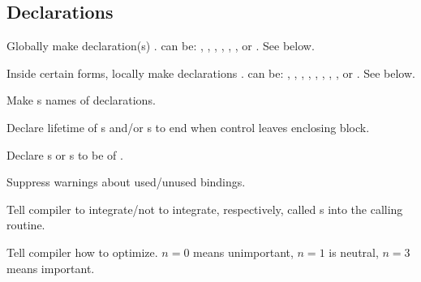 \subsection{Declarations}
\begin{LIST}{1cm}

  {
    Globally make declaration(s) .  can be:
    ,
    ,
    ,
    ,
    ,
    , or
    .
    See below.
  }

  {
    Inside certain forms, locally make declarations
    .  can be:
    ,
    ,
    ,
    ,
    ,
    ,
    ,
    , or
    .
    See below.
  }

  \begin{LIST}{.5cm}

    {
      Make s names of declarations.
    }

    {
      Declare lifetime of s and/or s to end
      when control leaves enclosing block.
    }


    {
      Declare s or s to be of .
    }

    {
      Suppress warnings about used/unused bindings.
    }

    {
      Tell compiler to integrate/not to integrate, respectively, called
      s into the calling routine.
    }

    {
      Tell compiler how to optimize. $n=0$ means unimportant, $n=1$ is
      neutral, $n=3$ means important.
    }


\end{LIST}
\end{LIST}
